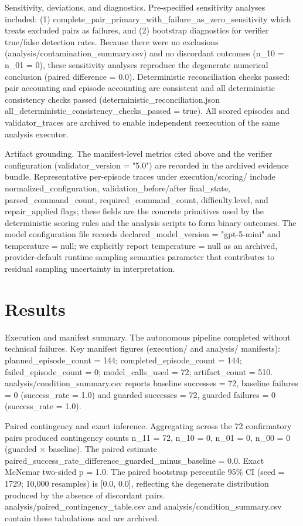 \documentclass[conference]{IEEEtran}
\begin{document}
Sensitivity, deviations, and diagnostics. Pre-specified sensitivity analyses included: (1) complete\_pair\_primary\_with\_failure\_as\_zero\_sensitivity which treats excluded pairs as failures, and (2) bootstrap diagnostics for verifier true/false detection rates. Because there were no exclusions (analysis/contamination\_summary.csv) and no discordant outcomes (n\_10 = n\_01 = 0), these sensitivity analyses reproduce the degenerate numerical conclusion (paired difference = 0.0). Deterministic reconciliation checks passed: pair accounting and episode accounting are consistent and all deterministic consistency checks passed (deterministic\_reconciliation.json all\_deterministic\_consistency\_checks\_passed = true). All scored episodes and validator\_traces are archived to enable independent reexecution of the same analysis executor.

Artifact grounding. The manifest-level metrics cited above and the verifier configuration (validator\_version = "5.0") are recorded in the archived evidence bundle. Representative per-episode traces under execution/scoring/ include normalized\_configuration, validation\_before/after final\_state, parsed\_command\_count, required\_command\_count, difficulty.level, and repair\_applied flags; these fields are the concrete primitives used by the deterministic scoring rules and the analysis scripts to form binary outcomes. The model configuration file records declared\_model\_version = "gpt-5-mini" and temperature = null; we explicitly report temperature = null as an archived, provider-default runtime sampling semantics parameter that contributes to residual sampling uncertainty in interpretation.

\section{Results}
Execution and manifest summary. The autonomous pipeline completed without technical failures. Key manifest figures (execution/ and analysis/ manifests): planned\_episode\_count = 144; completed\_episode\_count = 144; failed\_episode\_count = 0; model\_calls\_used = 72; artifact\_count = 510. analysis/condition\_summary.csv reports baseline successes = 72, baseline failures = 0 (success\_rate = 1.0) and guarded successes = 72, guarded failures = 0 (success\_rate = 1.0).

Paired contingency and exact inference. Aggregating across the 72 confirmatory pairs produced contingency counts n\_11 = 72, n\_10 = 0, n\_01 = 0, n\_00 = 0 (guarded \ensuremath{\times} baseline). The paired estimate paired\_success\_rate\_difference\_guarded\_minus\_baseline = 0.0. Exact McNemar two-sided p = 1.0. The paired bootstrap percentile 95\% CI (seed = 1729; 10,000 resamples) is [0.0, 0.0], reflecting the degenerate distribution produced by the absence of discordant pairs. analysis/paired\_contingency\_table.csv and analysis/condition\_summary.csv contain these tabulations and are archived.
\end{document}
